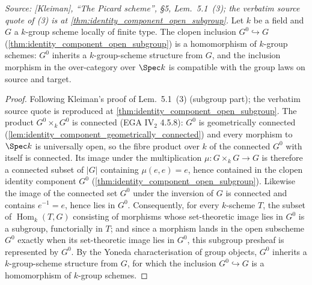 \begin{theorem}

  \label{thm:identity_component_is_subgroup_homomorphism}

  \textit{Source: [Kleiman], ``The Picard scheme'', \S 5,
  Lem.~5.1~(3); the verbatim source quote of (3) is at
  \cref{thm:identity_component_open_subgroup}.}
  Let \(k\) be a field and \(G\) a \(k\)-group scheme locally of finite
  type. The clopen inclusion \(G^0 \hookrightarrow G\)
  (\cref{thm:identity_component_open_subgroup}) is a homomorphism of
  \(k\)-group schemes: \(G^0\) inherits a \(k\)-group-scheme structure
  from \(G\), and the inclusion morphism in the over-category over
  \(\Spec k\) is compatible with the group laws on source and target.
\end{theorem}

\begin{proof}
  \leanok
  Following Kleiman's proof of Lem.~5.1~(3) (subgroup part); the
  verbatim source quote is reproduced at
  \cref{thm:identity_component_open_subgroup}.
  The product \(G^0 \times_k G^0\) is connected (EGA IV\(_2\) 4.5.8):
  \(G^0\) is geometrically connected
  (\cref{lem:identity_component_geometrically_connected}) and every
  morphism to \(\Spec k\) is universally open, so the fibre product over
  \(k\) of the connected \(G^0\) with itself is connected. Its image under
  the multiplication \(\mu : G \times_k G \to G\) is therefore a connected
  subset of \(|G|\) containing \(\mu(e, e) = e\), hence contained in the
  clopen identity component \(G^0\)
  (\cref{thm:identity_component_open_subgroup}). Likewise the image of the
  connected set \(G^0\) under the inversion of \(G\) is connected and
  contains \(e^{-1} = e\), hence lies in \(G^0\). Consequently, for every
  \(k\)-scheme \(T\), the subset of \(\operatorname{Hom}_k(T, G)\)
  consisting of morphisms whose set-theoretic image lies in \(G^0\) is a
  subgroup, functorially in \(T\); and since a morphism lands in the open
  subscheme \(G^0\) exactly when its set-theoretic image lies in \(G^0\),
  this subgroup presheaf is represented by \(G^0\). By the Yoneda
  characterisation of group objects, \(G^0\) inherits a \(k\)-group-scheme
  structure from \(G\), for which the inclusion \(G^0 \hookrightarrow G\)
  is a homomorphism of \(k\)-group schemes.
\end{proof}

